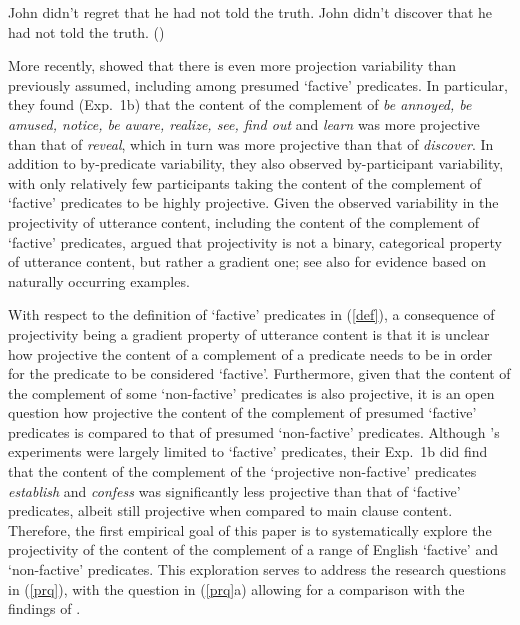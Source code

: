 \documentclass[11pt,fleqn]{article}
\newcommand{\6}{\mbox{$[\hspace*{-.6mm}[$}}
\newcommand{\9}{\mbox{$]\hspace*{-.6mm}]$}}
\newcommand{\citepos}[1]{\citeauthor{#1}'s \citeyear{#1}}
\begin{document}
\begin{exe}
\ex\label{semi-factive}
\begin{xlist}
\ex John didn't regret that he had not told the truth.
\ex John didn't discover that he had not told the truth.  
\hfill (\citealt[63]{karttunen71b})

\end{xlist}
\end{exe}
More recently, \citet*{tbd-variability} showed that there is even more projection variability than previously assumed, including among presumed `factive' predicates. In particular, they found (Exp.~1b) that the content of the complement of {\em be annoyed, be amused, notice, be aware, realize, see, find out} and {\em learn} was more projective than that of {\em reveal}, which in turn was more projective than that of {\em discover}. In addition to by-predicate variability, they also observed by-participant variability, with only relatively few participants taking the content of the complement of `factive' predicates to be highly projective. Given the observed variability in the projectivity of utterance content, including the content of the complement of `factive' predicates, \citet{tbd-variability} argued that projectivity is not a binary, categorical property of utterance content, but rather a gradient one; see also \citealt{demarneffe-etal2018} for evidence based on naturally occurring examples.  

With respect to the definition of `factive' predicates in (\ref{def}), a consequence of projectivity being a gradient property of utterance content is that it is unclear how projective the content of a complement of a predicate needs to be in order for the predicate to be considered `factive'. 
Furthermore, given that the content of the complement of some `non-factive' predicates is also projective, it is an open question how projective the content of the complement of presumed `factive' predicates is compared to that of presumed `non-factive' predicates. Although \citepos{tbd-variability} experiments were largely limited to `factive' predicates, their Exp.~1b did find that the content of the complement of the `projective non-factive' predicates {\em establish} and {\em confess} was significantly less projective than that of `factive' predicates, albeit still projective when compared to main clause content. Therefore, the first empirical goal of this paper is to systematically explore the projectivity of the content of the complement of a range of English `factive' and `non-factive' predicates. This exploration serves to address the research questions in (\ref{prq}), with the question in (\ref{prq}a) allowing for a comparison with the findings of \citealt{tbd-variability}.
\end{document}
